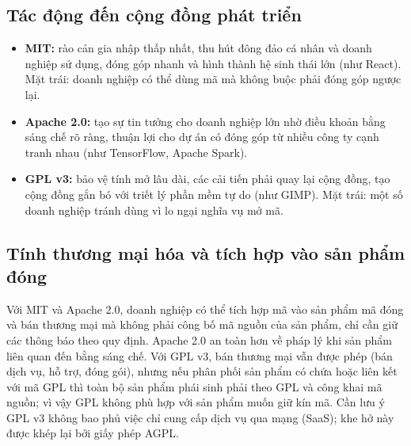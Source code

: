 \documentclass[12pt,a4paper]{article}
\begin{document}
\subsection{Tác động đến cộng đồng phát triển}
\begin{itemize}
  \item \textbf{MIT:} rào cản gia nhập thấp nhất, thu hút đông đảo cá nhân và doanh nghiệp sử dụng, đóng góp nhanh và hình thành hệ sinh thái lớn (như React). Mặt trái: doanh nghiệp có thể dùng mã mà không buộc phải đóng góp ngược lại.
  \item \textbf{Apache 2.0:} tạo sự tin tưởng cho doanh nghiệp lớn nhờ điều khoản bằng sáng chế rõ ràng, thuận lợi cho dự án có đóng góp từ nhiều công ty cạnh tranh nhau (như TensorFlow, Apache Spark).
  \item \textbf{GPL v3:} bảo vệ tính mở lâu dài, các cải tiến phải quay lại cộng đồng, tạo cộng đồng gắn bó với triết lý phần mềm tự do (như GIMP). Mặt trái: một số doanh nghiệp tránh dùng vì lo ngại nghĩa vụ mở mã.
\end{itemize}

\subsection{Tính thương mại hóa và tích hợp vào sản phẩm đóng}
Với MIT và Apache 2.0, doanh nghiệp có thể tích hợp mã vào sản phẩm mã đóng và bán thương mại mà không phải công bố mã nguồn của sản phẩm, chỉ cần giữ các thông báo theo quy định. Apache 2.0 an toàn hơn về pháp lý khi sản phẩm liên quan đến bằng sáng chế. Với GPL v3, bán thương mại vẫn được phép (bán dịch vụ, hỗ trợ, đóng gói), nhưng nếu phân phối sản phẩm có chứa hoặc liên kết với mã GPL thì toàn bộ sản phẩm phái sinh phải theo GPL và công khai mã nguồn; vì vậy GPL không phù hợp với sản phẩm muốn giữ kín mã. Cần lưu ý GPL v3 không bao phủ việc chỉ cung cấp dịch vụ qua mạng (SaaS); khe hở này được khép lại bởi giấy phép AGPL.
\end{document}
